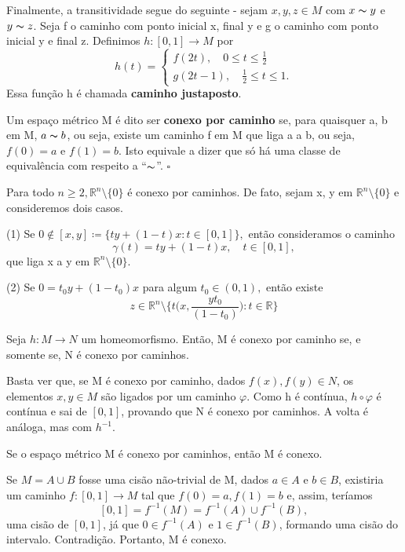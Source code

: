 \documentclass[MetricSpaces/metric_notes.tex]{subfiles}
\begin{document}
Finalmente, a transitividade segue do seguinte - sejam \(x, y, z\in M\) com \(x\thicksim y\) e \(y\thicksim z\). Seja f o caminho com ponto inicial x, final y e g o
caminho com ponto inicial y e final z. Definimos \(h:[0, 1]\rightarrow M \) por
\[
	h(t) = \left\{\begin{array}{ll}
		f(2t),\quad 0\leq t\leq \frac{1}{2} \\
		g(2t-1),\quad \frac{1}{2}\leq t\leq 1.
	\end{array}\right.
\]
Essa função h é chamada \textbf{caminho justaposto}.
\begin{def*}
	Um espaço métrico M é dito ser \textbf{conexo por caminho} se, para quaisquer a, b em M, \(a\thicksim b\), ou seja,
	existe um caminho f em M que liga a a b, ou seja, \(f(0)=a\) e \(f(1)=b.\) Isto equivale a dizer que só há uma
	classe de equivalência com respeito a ``\(\thicksim\)''. \(\square\)
\end{def*}
\begin{example}
	Para todo \(n\geq 2, \mathbb{R}^{n}\setminus\{0\}\) é conexo por caminhos. De fato, sejam x, y em \(\mathbb{R}^{n}\setminus\{0\}\) e
	consideremos dois casos.

	(1) Se \(0\not\in[x, y]\coloneqq \{ty + (1-t)x: t\in[0, 1]\},\) então consideramos o caminho
	\[
		\gamma (t) = ty + (1-t)x,\quad t\in[0,1],
	\]
	que liga x a y em \(\mathbb{R}^{n}\setminus\{0\}.\)

	(2) Se \(0 = t_{0}y + (1-t_{0})x\) para algum \(t_{0}\in (0, 1),\) então existe
	\[
		z\in \mathbb{R}^{n}\setminus\biggl\{t \biggl(x, \frac{yt_{0}}{(1-t_{0})}\biggr):t\in \mathbb{R}\biggr\}
	\]
\end{example}
\begin{theorem*}
	Seja \(h:M\rightarrow N\) um homeomorfismo. Então, M é conexo por caminho se, e somente se, N é conexo por caminhos.
\end{theorem*}
\begin{proof*}
	Basta ver que, se M é conexo por caminho, dados \(f(x), f(y)\in N\), os elementos \(x, y\in M\) são ligados por um caminho \(\varphi \). Como h
	é contínua, \(h\circ{\varphi }\) é contínua e sai de \([0, 1]\), provando que N é conexo por caminhos. A volta é análoga, mas com \(h^{-1}.\) \qedsymbol
\end{proof*}
\begin{theorem*}
	Se o espaço métrico M é conexo por caminhos, então M é conexo.
\end{theorem*}
\begin{proof*}
	Se \(M = A \cup B\) fosse uma cisão não-trivial de M, dados \(a\in A\) e \(b\in B\), existiria um caminho
	\(f:[0, 1]\rightarrow M\) tal que \(f(0) = a, f(1) = b\) e, assim, teríamos
	\[
		[0, 1] = f^{-1}(M) = f^{-1}(A)\cup f^{-1}(B),
	\]
	uma cisão de \([0, 1]\), já que \(0\in f^{-1}(A)\) e \(1\in f^{-1}(B)\), formando uma cisão do intervalo. Contradição.
	Portanto, M é conexo. \qedsymbol
\end{proof*}
\end{document}
